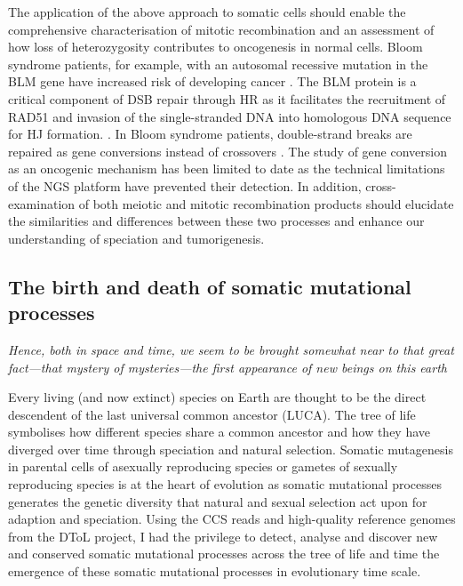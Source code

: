 The application of the above approach to somatic cells should enable the comprehensive characterisation of mitotic recombination and an assessment of how loss of heterozygosity contributes to oncogenesis in normal cells. Bloom syndrome patients, for example, with an autosomal recessive mutation in the BLM gene have increased risk of developing cancer \cite{}. The BLM protein is a critical component of DSB repair through HR as it facilitates the recruitment of RAD51 and invasion of the single-stranded DNA into homologous DNA sequence for HJ formation. \cite{}. In Bloom syndrome patients, double-strand breaks are repaired as gene conversions instead of crossovers \cite{}. The study of gene conversion as an oncogenic mechanism has been limited to date as the technical limitations of the NGS platform have prevented their detection. In addition, cross-examination of both meiotic and mitotic recombination products should elucidate the similarities and differences between these two processes and enhance our understanding of speciation and tumorigenesis. 

\subsection{The birth and death of somatic mutational processes}

\textit{Hence, both in space and time, we seem to be brought somewhat near to that great fact—that mystery of mysteries—the first appearance of new beings on this earth}
\begin{flushright}  \end{flushright} 

Every living (and now extinct) species on Earth are thought to be the direct descendent of the last universal common ancestor (LUCA). The tree of life symbolises how different species share a common ancestor and how they have diverged over time through speciation and natural selection. Somatic mutagenesis in parental cells of asexually reproducing species or gametes of sexually reproducing species is at the heart of evolution as somatic mutational processes generates the genetic diversity that natural and sexual selection act upon for adaption and speciation. Using the CCS reads and high-quality reference genomes from the DToL project, I had the privilege to detect, analyse and discover new and conserved somatic mutational processes across the tree of life and time the emergence of these somatic mutational processes in evolutionary time scale. 

